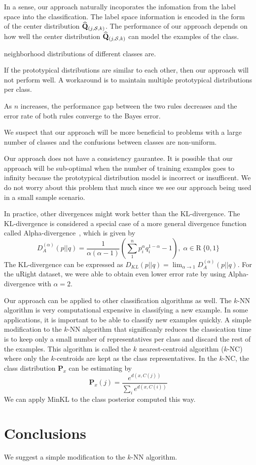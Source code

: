 \documentclass{article}
\begin{document}
In a sense, our approach naturally incoporates the infomation from the
label space into the classification. The label space information is
encoded in the form of the center distribution $\widehat{\mathbf{Q}}_{(j,\mathcal{S},k)}$. The
performance of our approach depends on how well the center
distribution $\widehat{\mathbf{Q}}_{(j,\mathcal{S},k)}$ can model the examples of the
class.


neighborhood distributions of different classes are. 


If the
prototypical distributions are similar to each other, then our
approach will not perform well. A workaround is to maintain multiple
prototypical distributions per class.




As $n$ increases, the performance gap between the two rules decreases and
the error rate of both rules converge to the Bayes error.




We suspect that our approach will be more beneficial to problems with
a large number of classes and the confusions between classes are
non-uniform.

Our approach does not have a consistency gaurantee. It is
possible that our approach will be sub-optimal when the number of
training examples goes to infinity because the prototypical
distribution model is incorrect or insufficent. We do not worry
about this problem that much since we see our approach being used
in a small sample scenario.

In practice, other divergences might work better than the
KL-divergence. The KL-divergence is considered a special case of a
more general divergence function called
Alpha-divergence~\cite{Cichocki2010}, which is given by
\[
D^{(\alpha)}_A (p||q) = \frac{1}{\alpha(\alpha - 1)}\left( \sum_1^n
  p^{\alpha}_i q^{1-\alpha}_i - 1\right), \; \alpha \in \mathrm{R} \ \{0,1\}
\]
The KL-divergence can be expressed as $D_{KL} (p || q) = \lim_{\alpha
  \rightarrow 1} D^{(\alpha)}_A (p || q)$.  For the uRight dataset, we
were able to obtain even lower error rate by using Alpha-divergence
with $\alpha = 2$.

Our approach can be applied to other classification algorithms as
well. The $k$-NN algorithm is very computational expensive in
classifying a new example. In some applications, it is important to be
able to classify new examples quickly. A simple modification to the
$k$-NN algorithm that significanly reduces the classication time is to
keep only a small number of representatives per class and discard the
rest of the examples. This algorithm is called the $k$
nearest-centroid algorithm ($k$-NC) where only the $k$-centroids are
kept as the class representatives. In the $k$-NC, the class
distribution $\mathbf{P}_x$ can be estimating by
\[
\mathbf{P}_x(j) = \frac{e^{d(x,C(j))}}{\sum_i e^{d(x, C(i))} }
\]
We can apply MinKL to the class posterior computed this way. 


\section{Conclusions}
\label{sec:conclusion}

We suggest a simple modification to the $k$-NN algorithm.



\end{document}
